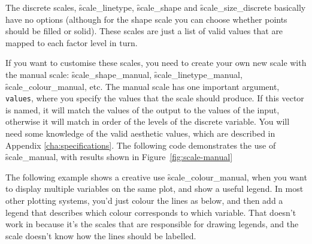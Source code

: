 The discrete scales, \f{scale_linetype}, \f{scale_shape} and \f{scale_size_discrete} basically have no options (although for the shape scale you can choose whether points should be filled or solid). These scales are just a list of valid values that are mapped to each factor level in turn.   

If you want to customise these scales, you need to create your own new scale with the manual scale: \f{scale_shape_manual}, \f{scale_linetype_manual}, \f{scale_colour_manual}, etc. The manual scale has one important argument, \verb|values|, where you specify the values that the scale should produce. If this vector is named, it will match the values of the output to the values of the input, otherwise it will match in order of the levels of the discrete variable. You will need some knowledge of the valid aesthetic values, which are described in Appendix \ref{cha:specifications}.  The following code demonstrates the use of \f{scale_manual}, with results shown in Figure~\ref{fig:scale-manual}   

% 


The following example shows a creative use \f{scale_colour_manual}, when you want to display multiple variables on the same plot, and show a useful legend. In most other plotting systems, you'd just colour the lines as below, and then add a legend that describes which colour corresponds to which variable.  That doesn't work in \ggplot because it's the scales that are responsible for drawing legends, and the scale doesn't know how the lines should be labelled.

% 


